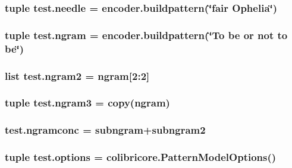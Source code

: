 \subsubsection[{needle}]{\setlength{\rightskip}{0pt plus 5cm}tuple test.\+needle = encoder.\+buildpattern(\char`\"{}fair Ophelia\char`\"{})}\label{namespacetest_a51ed4c3f6972c49e80c5c430c2d82153}
\hypertarget{namespacetest_a172822b9b1b04a83c37863777d586d66}{}
\subsubsection[{ngram}]{\setlength{\rightskip}{0pt plus 5cm}tuple test.\+ngram = encoder.\+buildpattern(\char`\"{}To be or not to be\char`\"{})}\label{namespacetest_a172822b9b1b04a83c37863777d586d66}
\hypertarget{namespacetest_a192953f02127a54653c24b19995e4ab5}{}
\subsubsection[{ngram2}]{\setlength{\rightskip}{0pt plus 5cm}list test.\+ngram2 = {\bf ngram}\mbox{[}2\+:2\mbox{]}}\label{namespacetest_a192953f02127a54653c24b19995e4ab5}
\hypertarget{namespacetest_a16964a57a08015b96ec6a0a5571221c4}{}
\subsubsection[{ngram3}]{\setlength{\rightskip}{0pt plus 5cm}tuple test.\+ngram3 = copy({\bf ngram})}\label{namespacetest_a16964a57a08015b96ec6a0a5571221c4}
\hypertarget{namespacetest_aa28f4be90818659453cac8fac2589d39}{}
\subsubsection[{ngramconc}]{\setlength{\rightskip}{0pt plus 5cm}test.\+ngramconc = {\bf subngram}+{\bf subngram2}}\label{namespacetest_aa28f4be90818659453cac8fac2589d39}
\hypertarget{namespacetest_a8e4cf0fa4db680c61526b4a824f43d23}{}
\subsubsection[{options}]{\setlength{\rightskip}{0pt plus 5cm}tuple test.\+options = colibricore.\+Pattern\+Model\+Options()}\label{namespacetest_a8e4cf0fa4db680c61526b4a824f43d23}
\hypertarget{namespacetest_a11b1ef528efe815402e528cb353937d2}{}
